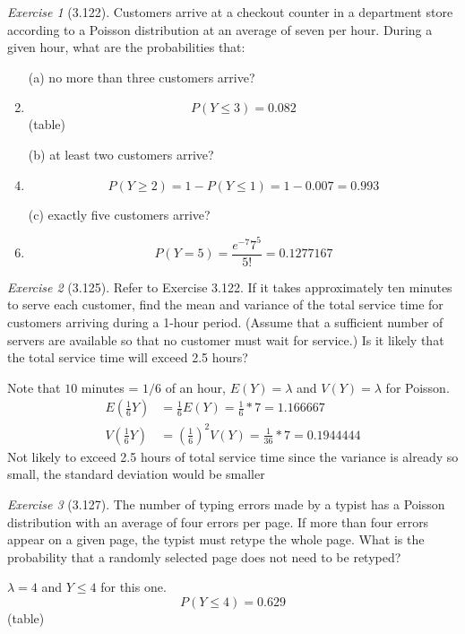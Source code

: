 \documentclass[12pt]{amsart}
\makeatletter
\theoremstyle{remark}
\newtheorem*{exercise}{Exercise}%
\renewenvironment{proof}[1][\proofname]{\par\doublespacing
  \pushQED{\qed}%
  \normalfont \topsep6\p@\@plus6\p@\relax
  \list{}{%
    \settowidth{\leftmargin}{\itshape\proofname:\hskip\labelsep}%
    \setlength{\labelwidth}{0pt}%
    \setlength{\itemindent}{-\leftmargin}%
  }%
  \item[\hskip\labelsep\itshape#1\@addpunct{:}]\ignorespaces
}{%
  \popQED\endlist\@endpefalse
  \singlespacing
}
\theoremstyle{mycomment}
\makeatother
\begin{document}
\begin{exercise}[3.122]
Customers arrive at a checkout counter in a department store according to a Poisson distribution at an average of seven per hour. During a given hour, what are the probabilities that:
 
\begin{enumerate}
    \item[(a)] no more than three customers arrive?
\begin{proof}[Solution]
	$$P(Y \leq 3) =  0.082$$
	(table)
\end{proof}
    \item[(b)] at least two customers arrive?
\begin{proof}[Solution]
	$$P(Y \geq 2) = 1 - P(Y \leq 1) = 1 - 0.007 = 0.993 $$
 
\end{proof}
    \item[(c)] exactly five customers arrive?
\begin{proof}[Solution]
	$$P(Y = 5) = \frac{e^{-7}7^5}{5!} = 0.1277167$$ 
\end{proof}
\end{enumerate} 
\end{exercise}

\begin{exercise}[3.125]
Refer to Exercise 3.122. If it takes approximately ten minutes to serve each customer, find the mean and variance of the total service time for customers arriving during a 1-hour period. (Assume that a sufficient number of servers are available so that no customer must wait for service.) Is it likely that the total service time will exceed 2.5 hours?

\begin{proof}[Solution]
	Note that $10$ minutes = $1/6$ of an hour, $E(Y) = \lambda$ and $V(Y) = \lambda$ for Poisson.
	\begin{align*}
		E(\frac{1}{6}Y) &= \frac{1}{6} E(Y) = \frac{1}{6} * 7 = 1.166667 \\
		V(\frac{1}{6}Y) &= (\frac{1}{6})^2V(Y) = \frac{1}{36} * 7 = 0.1944444 
	\end{align*}
	Not likely to exceed 2.5 hours of total service time since the variance is already so small, the standard deviation would be smaller
\end{proof}
\end{exercise}

\begin{exercise}[3.127]
The number of typing errors made by a typist has a Poisson distribution with an average of four errors per page. If more than four errors appear on a given page, the typist must retype the whole page. What is the probability that a randomly selected page does not need to be retyped?

\begin{proof}[Solution]
	$\lambda = 4$ and $Y \leq 4$ for this one.
	$$P(Y \leq 4) = 0.629$$ 
	(table)
\end{proof}
\end{exercise}
\end{document}
